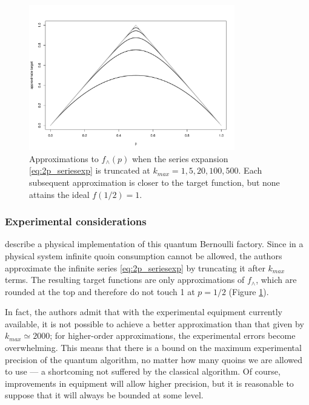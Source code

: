 \documentclass{article}
\theoremstyle{definition}
\begin{document}
\begin{figure}
\centering
\includegraphics[width=0.8\textwidth]{approxtarget_1520100500.pdf}
\caption{Approximations to $f_\wedge(p)$ when the series expansion \eqref{eq:2p_seriesexp} is truncated at $k_{max} = 1,5,20,100,500$. Each subsequent approximation is closer to the target function, but none attains the ideal $f(1/2)=1$.}
\label{fig:qbf_target_approximations}
\end{figure}

\subsubsection{Experimental considerations}
\citet{patel2018} describe a physical implementation of this quantum Bernoulli factory. 
Since in a physical system infinite quoin consumption cannot be allowed, the authors approximate the infinite series \eqref{eq:2p_seriesexp} by truncating it after $k_{max}$ terms. The resulting target functions are only approximations of $f_\wedge$, which are rounded at the top and therefore do not touch 1 at $p=1/2$ (Figure \ref{fig:qbf_target_approximations}). %

In fact, the authors admit that with the experimental equipment currently available, it is not possible to achieve a better approximation than that given by $k_{max} \simeq 2000$; for higher-order approximations, the experimental errors become overwhelming. This means that there is a bound on the maximum experimental precision of the quantum algorithm, no matter how many quoins we are allowed to use --- a shortcoming not suffered by the classical algorithm. Of course, improvements in equipment will allow higher precision, but it is reasonable to suppose that it will always be bounded at some level.
\end{document}
